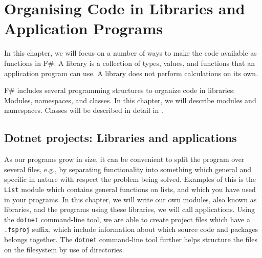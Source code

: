 \documentclass[fsharpNotes.tex]{subfiles}
\begin{document}
\chapter{Organising Code in Libraries and Application Programs}
\label{chap:modules}

In this chapter, we will focus on a number of ways to make the code available as  functions in F\#. A library is a collection of types, values, and functions that an application program can use. A library does not perform calculations on its own.

F\# includes several programming structures to organize code in libraries: Modules, namespaces, and classes. In this chapter, we will describe modules and namespaces. Classes will be described in detail in .

\section{Dotnet projects: Libraries and applications}
\label{chap:projects}
As our programs grow in size, it can be convenient to split the program over several files, e.g., by separating functionality into something which general and specific in  nature with respect the problem being solved. Examples of this is the \lstinline{List} module which contains general functions on lists, and which you have used in your programs. In this chapter, we will write our own modules, also known as libraries, and the programs using these libraries, we will call applications. Using the \lstinline[language=console]{dotnet} command-line tool, we are able to create project files which have a \lstinline[language=console]{.fsproj} suffix, which include information about which source code and packages belongs together. The \lstinline[language=console]{dotnet} command-line tool further helps structure the files on the filesystem by use of directories.
\end{document}
